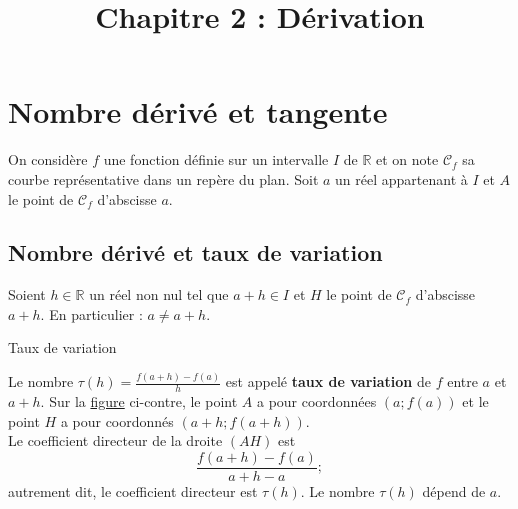 \documentclass[11pt]{article}
\title{Chapitre 2 : Dérivation}
\date{}
\author{}
\begin{document}
\maketitle\thispagestyle{fancy}

\newcommand{\Cf}{\mathscr{C}_f}

\section{Nombre dérivé et tangente}
On considère $f$ une fonction définie sur un intervalle $I$ de $\mathbb{R}$ et
on note $\Cf$ sa courbe représentative dans un repère du plan. Soit $a$ un réel
appartenant à $I$ et $A$ le point de $\Cf$ d'abscisse $a$.

\subsection{Nombre dérivé et taux de variation}
Soient $h\in\mathbb{R}$ un réel non nul tel que $a+h\in I$ et $H$ le point de
$\Cf$ d'abscisse $a+h$. En particulier : $a\neq a+h$. 
\begin{defi}{Taux de variation}
  \begin{minipage}{.6\textwidth}
    Le nombre $\tau(h) =\frac{f(a+h)-f(a)}{h}$ est appelé \textbf{taux de
    variation} de $f$ entre $a$ et $a+h$. Sur la
    \href{https://www.geogebra.org/m/bj5pnzvr}{figure} ci-contre,
    le point $A$ a pour coordonnées $(a; f(a))$ et le point $H$ a pour coordonnés
    $(a+h; f(a+h))$.\\
    Le coefficient directeur de la droite $(AH)$ est
    \[
      \frac{f(a+h)-f(a)}{a+h-a};
    \]
    autrement dit, le coefficient directeur est $\tau(h)$. Le nombre $\tau(h)$
    dépend de $a$.
  \end{minipage}
  \begin{minipage}{.4\textwidth}
    \begin{center}
    \end{center}
  \end{minipage}
\end{defi}
\end{document}
